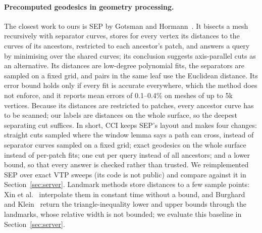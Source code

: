 \documentclass[sigconf,nonacm,screen]{acmart}
\newcommand{\cci}{CCI\xspace}
\begin{document}
\paragraph{Precomputed geodesics in geometry processing.}
The closest work to ours is SEP by Gotsman and Hormann~\cite{gotsman2022compressing}. It bisects a mesh
recursively with separator curves, stores for every vertex its distances to the curves of its ancestors,
restricted to each ancestor's patch, and answers a query by minimising over the shared curves; its conclusion
suggests axis-parallel cuts as an alternative. Its distances are low-degree polynomial fits, the separators
are sampled on a fixed grid, and pairs in the same leaf use the Euclidean distance. Its error bound holds only
if every fit is accurate everywhere, which the method does not enforce, and it reports mean errors of
0.1--0.4\% on meshes of up to 5k vertices. Because its distances are restricted to patches, every ancestor curve
has to be scanned; our labels are distances on the whole surface, so the deepest separating cut suffices. In short, \cci keeps SEP's layout and makes four changes: straight cuts sampled where the window lemma says a path
can cross, instead of separator curves sampled on a fixed grid; exact geodesics on the whole surface instead of
per-patch fits; one cut per query instead of all ancestors; and a lower bound, so that every answer is checked
rather than trusted. We reimplemented SEP over exact VTP sweeps (its code is not public) and compare against it in
Section~\ref{sec:server}.
Landmark methods store distances to a few sample points: Xin et al.~\cite{xin2012constant} interpolate them
in constant time without a bound, and Burghard and Klein~\cite{burghard2015simple} return the triangle-inequality
lower and upper bounds through the landmarks, whose relative width is not bounded; we evaluate this baseline in
Section~\ref{sec:server}.
\end{document}
